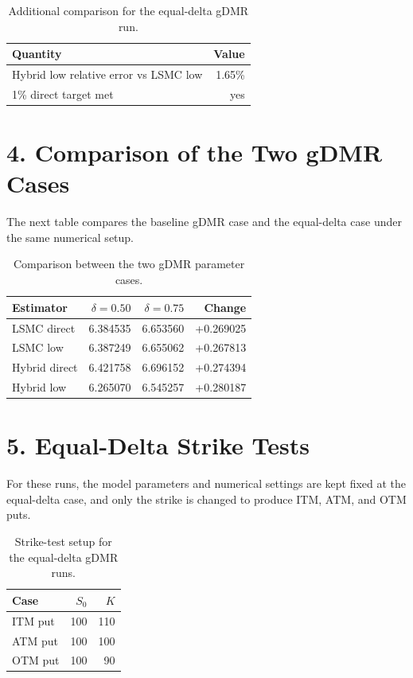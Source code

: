 \documentclass[11pt]{article}
\begin{document}
\begin{table}[htbp]
\centering
\caption{Additional comparison for the equal-delta gDMR run.}
\begin{tabular}{lr}
\toprule
Quantity & Value \\
\midrule
Hybrid low relative error vs LSMC low & 1.65\% \\
1\% direct target met & yes \\
\bottomrule
\end{tabular}
\end{table}

\section*{4. Comparison of the Two gDMR Cases}

The next table compares the baseline gDMR case and the equal-delta case under the same numerical setup.

\begin{table}[htbp]
\centering
\caption{Comparison between the two gDMR parameter cases.}
\begin{tabular}{lrrr}
\toprule
Estimator & $\delta=0.50$ & $\delta=0.75$ & Change \\
\midrule
LSMC direct   & 6.384535 & 6.653560 & +0.269025 \\
LSMC low      & 6.387249 & 6.655062 & +0.267813 \\
Hybrid direct & 6.421758 & 6.696152 & +0.274394 \\
Hybrid low    & 6.265070 & 6.545257 & +0.280187 \\
\bottomrule
\end{tabular}
\end{table}

\section*{5. Equal-Delta Strike Tests}

For these runs, the model parameters and numerical settings are kept fixed at the equal-delta case,
and only the strike is changed to produce ITM, ATM, and OTM puts.

\begin{table}[htbp]
\centering
\caption{Strike-test setup for the equal-delta gDMR runs.}
\begin{tabular}{lrr}
\toprule
Case & $S_0$ & $K$ \\
\midrule
ITM put & 100 & 110 \\
ATM put & 100 & 100 \\
OTM put & 100 & 90 \\
\bottomrule
\end{tabular}
\end{table}
\end{document}
